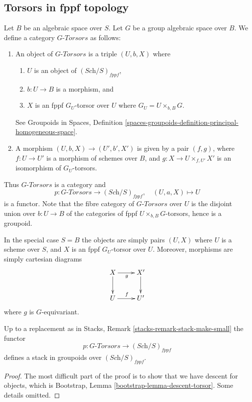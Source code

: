 \subsection{Torsors in fppf topology}
\label{subsection-fppf-torsors}

\noindent
Let $B$ be an algebraic space over $S$.
Let $G$ be a group algebraic space over $B$.
We define a category $G\textit{-Torsors}$ as follows:
\begin{enumerate}
\item An object of $G\textit{-Torsors}$ is a triple $(U, b, X)$ where
\begin{enumerate}
\item $U$ is an object of $(\textit{Sch}/S)_{fppf}$,
\item $b : U \to B$ is a morphism, and
\item $X$ is an fppf $G_U$-torsor over $U$ where $G_U = U \times_{b, B} G$.
\end{enumerate}
See
Groupoids in Spaces,
Definition \ref{spaces-groupoids-definition-principal-homogeneous-space}.
\item A morphism $(U, b, X) \to (U', b', X')$ is given
by a pair $(f, g)$, where $f : U \to U'$ is a morphism of schemes
over $B$, and $g : X \to U \times_{f, U'} X'$ is an
isomorphism of $G_U$-torsors.
\end{enumerate}
Thus $G\textit{-Torsors}$ is a category and
$$
p : G\textit{-Torsors} \longrightarrow (\textit{Sch}/S)_{fppf},
\quad
(U, a, X) \longmapsto U
$$
is a functor. Note that the fibre category of $G\textit{-Torsors}$
over $U$ is the disjoint union over $b : U \to B$
of the categories of fppf $U \times_{b, B} G$-torsors,
hence is a groupoid.

\medskip\noindent
In the special case $S = B$ the objects are simply pairs
$(U, X)$ where $U$ is a scheme over $S$, and $X$ is an fppf
$G_U$-torsor over $U$. Moreover, morphisms are simply cartesian
diagrams
$$
\xymatrix{
X \ar[d] \ar[r]_g & X' \ar[d] \\
U \ar[r]^f & U'
}
$$
where $g$ is $G$-equivariant.

\begin{lemma}
\label{lemma-torsors-stack-in-groupoids}
Up to a replacement as in
Stacks, Remark \ref{stacks-remark-stack-make-small}
the functor
$$
p : G\textit{-Torsors} \longrightarrow (\textit{Sch}/S)_{fppf}
$$
defines a stack in groupoids over $(\textit{Sch}/S)_{fppf}$.
\end{lemma}

\begin{proof}
The most difficult part of the proof is to show that we have descent for
objects, which is
Bootstrap, Lemma \ref{bootstrap-lemma-descent-torsor}.
Some details omitted.
\end{proof}

